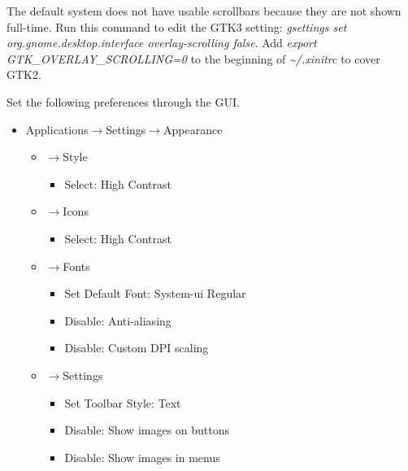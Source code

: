\documentclass{memoir}
\begin{document}
The default system does not have usable scrollbars because they are not shown full-time. Run this command to edit the GTK3 setting: \textit{gsettings set org.gnome.desktop.interface overlay-scrolling false}. Add \textit{export GTK\_OVERLAY\_SCROLLING=0} to the beginning of \textit{\textasciitilde/.xinitrc} to cover GTK2.

Set the following preferences through the GUI.

\pagebreak
\vspace{0.5cm}
\begin{itemize}
\item[]{Applications$\rightarrow$Settings$\rightarrow$Appearance}
  \begin{itemize}
  \item[]{$\rightarrow$Style}
    \begin{itemize}
      \item[]{Select: High Contrast}
    \end{itemize}
  \item[]{$\rightarrow$Icons}
    \begin{itemize}
      \item[]{Select: High Contrast}
    \end{itemize}
  \item[]{$\rightarrow$Fonts}
    \begin{itemize}
      \item[]{Set Default Font: System-ui Regular}
      \item[]{Disable: Anti-aliasing}
      \item[]{Disable: Custom DPI scaling}
    \end{itemize}
  \item[]{$\rightarrow$Settings}
    \begin{itemize}
      \item[]{Set Toolbar Style: Text}
      \item[]{Disable: Show images on buttons}
      \item[]{Disable: Show images in menus}
    \end{itemize}
  \end{itemize}
\end{itemize}
\end{document}
